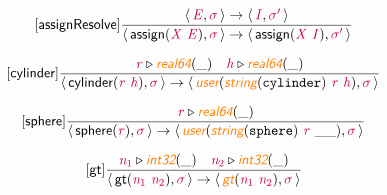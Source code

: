 \documentclass[10pt,leqno,fleqn]{article}
\newcommand{\artVariable}[1]{\mbox{\color{purple}\em #1\/}}
\newcommand{\artConstructor}[1]{\mbox{\sf #1}}
\newcommand{\artCaseInsensitiveLiteral}[1]{\mbox{\tt #1}}
\newcommand{\artSpecial}[1]{\mbox{\color{orange}\sf\em #1}}
\begin{document}
\begin{equation}
\tag*{[\artConstructor{\sf assignResolve}]}
\begin{split}\frac{\langle\, \artVariable{E}, \artVariable{$\sigma$}\,\rangle \rightarrow \langle\, \artVariable{I}, \artVariable{$\sigma$\/$^\prime$}\,\rangle }{\langle\, \artConstructor{\sf assign}(\artVariable{X}\ \artVariable{E}), \artVariable{$\sigma$}\,\rangle \rightarrow \langle\, \artConstructor{\sf assign}(\artVariable{X}\ \artVariable{I}), \artVariable{$\sigma$\/$^\prime$}\,\rangle }
\end{split}
\end{equation}

\begin{equation}
\tag*{[\artConstructor{\sf cylinder}]}
\begin{split}\frac{ \artVariable{r}\triangleright \artSpecial{real64}(\_) \quad  \artVariable{h}\triangleright \artSpecial{real64}(\_) }{\langle\, \artConstructor{\sf cylinder}(\artVariable{r}\ \artVariable{h}), \artVariable{$\sigma$}\,\rangle \rightarrow \langle\, \artSpecial{user}(\artSpecial{string}(\artCaseInsensitiveLiteral{cylinder})\ \artVariable{r}\ \artVariable{h}), \artVariable{$\sigma$}\,\rangle }
\end{split}
\end{equation}

\begin{equation}
\tag*{[\artConstructor{\sf sphere}]}
\begin{split}\frac{ \artVariable{r}\triangleright \artSpecial{real64}(\_) }{\langle\, \artConstructor{\sf sphere}(\artVariable{r}), \artVariable{$\sigma$}\,\rangle \rightarrow \langle\, \artSpecial{user}(\artSpecial{string}(\artCaseInsensitiveLiteral{sphere})\ \artVariable{r}\ \_\_), \artVariable{$\sigma$}\,\rangle }
\end{split}
\end{equation}

\begin{equation}
\tag*{[\artConstructor{\sf gt}]}
\begin{split}\frac{ \artVariable{n$_{1}$}\triangleright \artSpecial{int32}(\_) \quad  \artVariable{n$_{2}$}\triangleright \artSpecial{int32}(\_) }{\langle\, \artConstructor{\sf gt}(\artVariable{n$_{1}$}\ \artVariable{n$_{2}$}), \artVariable{$\sigma$}\,\rangle \rightarrow \langle\, \artSpecial{gt}(\artVariable{n$_{1}$}\ \artVariable{n$_{2}$}), \artVariable{$\sigma$}\,\rangle }
\end{split}
\end{equation}
\end{document}
